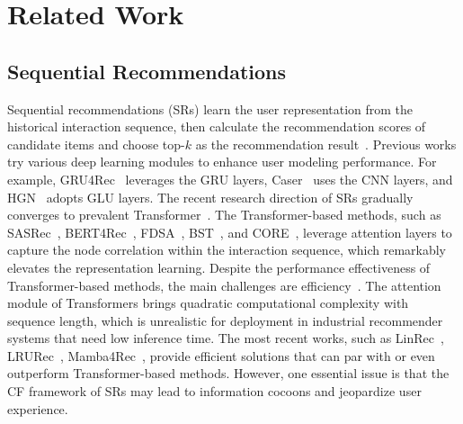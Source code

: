 \section{Related Work}
\subsection{Sequential Recommendations}
Sequential recommendations (SRs) learn the user representation from the historical interaction sequence, then calculate the recommendation scores of candidate items and choose top-$k$ as the recommendation result~\cite{fang2020deep,wang2019sequential}. 
Previous works try various deep learning modules to enhance user modeling performance. For example, GRU4Rec~\cite{hidasi2015session} leverages the GRU layers, Caser~\cite{tang2018personalized} uses the CNN layers, and HGN~\cite{ma2019hierarchical} adopts GLU layers. The recent research direction of SRs gradually converges to prevalent Transformer~\cite{vaswani2017attention}. The Transformer-based methods, such as SASRec~\cite{kang2018self}, BERT4Rec~\cite{sun2019bert4rec}, FDSA~\cite{zhang2019feature}, BST~\cite{chen2019behavior}, and CORE~\cite{hou2022core}, leverage attention layers to capture the node correlation within the interaction sequence, which remarkably elevates the representation learning.
Despite the performance effectiveness of Transformer-based methods, the main challenges are efficiency~\cite{tay2022efficient}. The attention module of Transformers brings quadratic computational complexity with sequence length, which is unrealistic for deployment in industrial recommender systems that need low inference time. The most recent works, such as LinRec~\cite{liu2023linrec}, LRURec~\cite{yue2024linear}, Mamba4Rec~\cite{liu2024mamba4rec}, provide efficient solutions that can par with or even outperform Transformer-based methods. However, one essential issue is that the CF framework of SRs may lead to information cocoons and jeopardize user experience.

